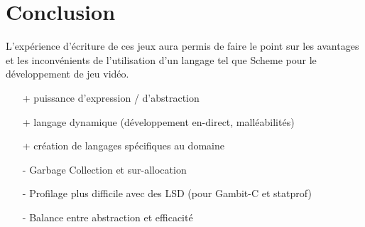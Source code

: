 \documentclass[12pt,oneside,letterpaper,francais]{book}
\newcommand{\codeinput}[1]{\begin{singlespace}\end{singlespace}}
\begin{document}
\chapter{Conclusion}


L'expérience d'écriture de ces jeux aura permis de faire le point sur
les avantages et les inconvénients de l'utilisation d'un langage tel
que Scheme pour le développement de jeu vidéo.


\begin{itemize}
  \item[+] puissance d'expression / d'abstraction
  \item[+] langage dynamique (développement en-direct, malléabilités)
  \item[+] création de langages spécifiques au domaine

  \item[-] Garbage Collection et sur-allocation
  \item[-] Profilage plus difficile avec des LSD (pour Gambit-C et statprof)
  \item[-] Balance entre abstraction et efficacité
\end{itemize}





\appendix




\end{document}
